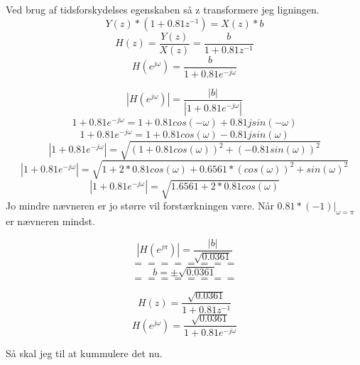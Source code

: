 \begin{Opgaver}
\begin{kapitel}
\begin{Udklip}
\begin{Opgave}
    
                \begin{UnderOpgave}
                    Ved brug af tidsforskydelses egenskaben så z transformere jeg ligningen. 
                    \[Y(z)*(1 + 0.81z^{-1}) = X(z)*b\]
                    \[H(z) = \frac{Y(z)}{X(z)} = \frac{b}{1 + 0.81z^{-1}}\]
                    \[H(e^{j\omega}) = \frac{b}{1 + 0.81e^{-j\omega}}\]
                
                \end{UnderOpgave}
                \begin{UnderOpgave}[Determine b so that $|H(e^{j\omega})|_max = 1$. Plot the resulting magnitude response.]
                    \[|H(e^{j\omega})| = \frac{|b|}{|1 + 0.81e^{-j\omega}|}\]
                    \[1 + 0.81e^{-j\omega} = 1 + 0.81cos(-\omega) + 0.81jsin(-\omega)\] 
                    \[1 + 0.81e^{-j\omega} = 1 + 0.81cos(\omega) - 0.81jsin(\omega)\] 
                    \[|1 + 0.81e^{-j\omega}| = \sqrt{(1 + 0.81cos(\omega))^2 + (-0.81sin(\omega))^2}\] 
                    \[|1 + 0.81e^{-j\omega}| = \sqrt{1 + 2*0.81cos(\omega) + 0.6561*(cos(\omega))^2 + sin(\omega)^2}\] 
                    \[|1 + 0.81e^{-j\omega}| = \sqrt{1.6561 + 2*0.81cos(\omega)}\] 
                    Jo mindre nævneren er jo større vil forstærkningen være. Når $0.81*(-1)|_{\omega=\pi}$ er nævneren mindst.
        
                    \[|H(e^{j\pi})| = \frac{|b|}{\sqrt{0.0361}}\]
                    \[========\]
                    \[b = \pm \sqrt{0.0361}\] 
                    \[========\]
    
                    \[H(z) = \frac{\sqrt{0.0361}}{1 + 0.81z^{-1}}\]
                    \[H(e^{j\omega}) = \frac{\sqrt{0.0361}}{1 + 0.81e^{-j\omega}}\]
                    
                \end{UnderOpgave}
    
                \begin{UnderOpgave}
                    Så skal jeg til at kummulere det nu. 
    
                \end{UnderOpgave}
    
                \begin{UnderOpgave}[\text{Determine analytically the response $y[n]$ to the input $x[n] = 2 cos(0.52n + 60°)$.}]
                    

\end{UnderOpgave}
\end{Opgave}
\end{Udklip}
\end{kapitel}
\end{Opgaver}
